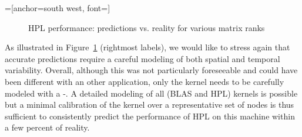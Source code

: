         =[anchor=south west, font=\scriptsize]
        \begin{figure}[htpb]
            \centering
            \begin{minipage}{0.8\linewidth}
                \caption{HPL performance: predictions vs. reality for various matrix ranks}
                \label{fig:validation_performance}
            \end{minipage}%
            \begin{minipage}{0.2\linewidth}
            \end{minipage}
        \end{figure}

        As illustrated in Figure~\ref{fig:validation_performance} (rightmost labels), we would like to stress again that
        accurate predictions require a careful modeling of both spatial and temporal variability. Overall, although this
        was not particularly foreseeable and could have been different with an other application, only the \dgemm kernel
        needs to be carefully modeled with a -. A detailed modeling of all (BLAS and HPL)
        kernels is possible but a minimal calibration of the \dgemm kernel over a representative set of nodes is thus
        sufficient to consistently predict the performance of HPL on this machine within a few percent of reality.

